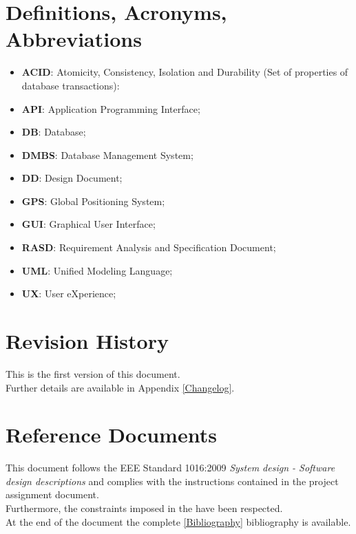 \section{Definitions, Acronyms, Abbreviations}
\begin{itemize}
  \setlength{\itemindent}{-.4in}
  \item[] \textbf{ACID}: Atomicity, Consistency, Isolation and Durability (Set of properties of database transactions):
  \item[] \textbf{API}: Application Programming Interface;
  \item[] \textbf{DB}: Database;
  \item[] \textbf{DMBS}: Database Management System;
  \item[] \textbf{DD}: Design Document;
  \item[] \textbf{GPS}: Global Positioning System;
  \item[] \textbf{GUI}: Graphical User Interface;
  \item[] \textbf{RASD}: Requirement Analysis and Specification Document;
  \item[] \textbf{UML}: Unified Modeling Language;
  \item[] \textbf{UX}: User eXperience;
\end{itemize}
\section{Revision History}
This is the first version of this document.\\
Further details are available in Appendix \ref{Changelog}.

\section{Reference Documents}
This document follows the EEE Standard 1016:2009 \textit{System design - Software design descriptions} and complies with the instructions contained in the project assignment document.\\
Furthermore, the constraints imposed in the  have been respected.\\
At the end of the document the complete \ref{Bibliography} bibliography is available.

